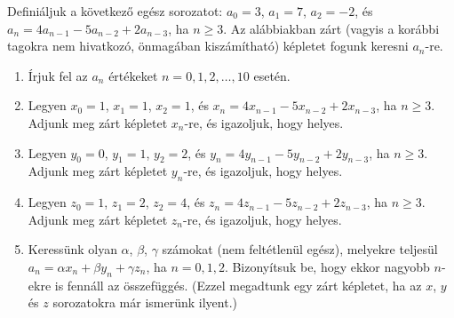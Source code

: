 \documentclass[11pt,a4paper]{article}
\begin{document}
Definiáljuk a következő egész sorozatot: $a_0 = 3$, $a_1 = 7$, $a_2 = -2$, és $a_{n} = 4a_{n-1} - 5a_{n-2} + 2a_{n-3}$, ha $n\geq 3$. Az alábbiakban zárt (vagyis a korábbi tagokra nem hivatkozó, önmagában kiszámítható) képletet fogunk keresni $a_n$-re.

\begin{enumerate}

\item Írjuk fel az $a_n$ értékeket $n=0, 1, 2, \ldots, 10$ esetén.

\item Legyen $x_0 = 1$, $x_1 = 1$, $x_2 = 1$, és $x_{n} = 4x_{n-1} - 5x_{n-2} + 2x_{n-3}$, ha $n\geq 3$. Adjunk meg zárt képletet $x_n$-re, és igazoljuk, hogy helyes.

\item Legyen $y_0 = 0$, $y_1 = 1$, $y_2 = 2$, és $y_{n} = 4y_{n-1} - 5y_{n-2} + 2y_{n-3}$, ha $n\geq 3$. Adjunk meg zárt képletet $y_n$-re, és igazoljuk, hogy helyes.

\item Legyen $z_0 = 1$, $z_1 = 2$, $z_2 = 4$, és $z_{n} = 4z_{n-1} - 5z_{n-2} + 2z_{n-3}$, ha $n\geq 3$. Adjunk meg zárt képletet $z_n$-re, és igazoljuk, hogy helyes.

\item Keressünk olyan $\alpha$, $\beta$, $\gamma$ számokat (nem feltétlenül egész), melyekre teljesül $a_n = \alpha x_n + \beta y_n + \gamma z_n$, ha $n=0, 1, 2$. Bizonyítsuk be, hogy ekkor nagyobb $n$-ekre is fennáll az összefüggés. (Ezzel megadtunk egy zárt képletet, ha az $x$, $y$ és $z$ sorozatokra már ismerünk ilyent.)

\end{enumerate}
\end{document}
